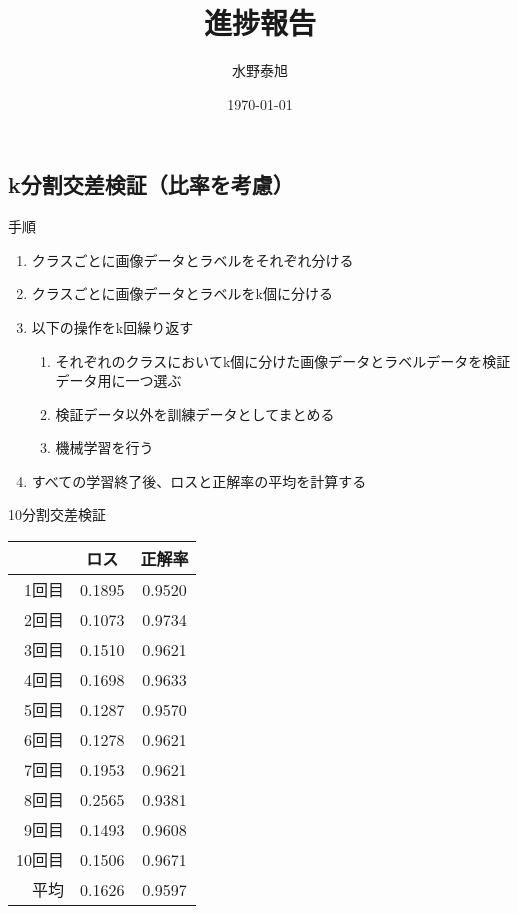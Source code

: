 \documentclass[leno,xcolor=dvipsnames]{beamer}
\title{進捗報告}
\date{\today}
\author{水野泰旭}
\institute{弘前大学理工学部電子情報工学科４年}
\begin{document}
  \maketitle

\begin{frame}
    \section{k分割交差検証（比率を考慮）}
\end{frame}

\begin{frame}{手順}
    \begin{enumerate}
        \item クラスごとに画像データとラベルをそれぞれ分ける
        \item クラスごとに画像データとラベルをk個に分ける
        \item 以下の操作をk回繰り返す
        \begin{enumerate}
            \item それぞれのクラスにおいてk個に分けた画像データとラベルデータを検証データ用に一つ選ぶ
            \item 検証データ以外を訓練データとしてまとめる
            \item 機械学習を行う
        \end{enumerate} 
        \item すべての学習終了後、ロスと正解率の平均を計算する
    \end{enumerate}
\end{frame}

\begin{frame}{10分割交差検証}
    \begin{table}[H]
        \centering  
        \begin{tabular}{rSS}
            \toprule    
            & ロス & 正解率 \\
            \midrule
            1回目 & 0.1895 & 0.9520 \\ 
            2回目 & 0.1073 & 0.9734 \\ 
            3回目 & 0.1510 & 0.9621 \\ 
            4回目 & 0.1698 & 0.9633 \\ 
            5回目 & 0.1287 & 0.9570 \\ 
            6回目 & 0.1278 & 0.9621 \\
            7回目 & 0.1953 & 0.9621 \\
            8回目 & 0.2565 & 0.9381 \\
            9回目 & 0.1493 & 0.9608 \\
            10回目 & 0.1506 & 0.9671 \\
            \midrule
            平均 & 0.1626 & 0.9597 \\
            \bottomrule
        \end{tabular}
    \end{table}
\end{frame}
\end{document}
